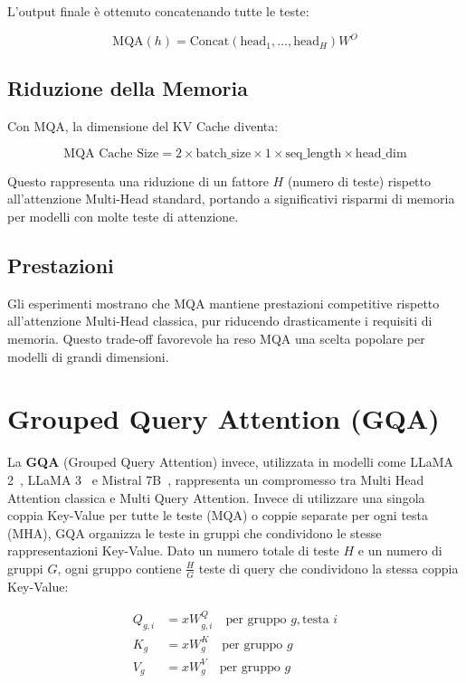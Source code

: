 L'output finale è ottenuto concatenando tutte le teste:

\[
    \text{MQA}(h) = \text{Concat}(\text{head}_1, \ldots, \text{head}_H) W^O
\]

\subsection{Riduzione della Memoria}
Con MQA, la dimensione del KV Cache diventa:

\[
    \text{MQA Cache Size} = 2 \times \text{batch\_size} \times 1 \times \text{seq\_length} \times \text{head\_dim}
\]

Questo rappresenta una riduzione di un fattore $H$ (numero di teste) rispetto all'attenzione Multi-Head standard, portando a significativi risparmi di memoria per modelli con molte teste di attenzione.

\subsection{Prestazioni}
Gli esperimenti mostrano che MQA mantiene prestazioni competitive rispetto all'attenzione Multi-Head classica, pur riducendo drasticamente i requisiti di memoria. Questo trade-off favorevole ha reso MQA una scelta popolare per modelli di grandi dimensioni.

\section{Grouped Query Attention (GQA)}

La \textbf{GQA} (Grouped Query Attention) invece, utilizzata in modelli come LLaMA 2~\cite{touvron2023llama}, LLaMA 3~\cite{touvron2024llama3} e Mistral 7B~\cite{mistral2023mistral7b}, rappresenta un compromesso tra Multi Head Attention classica e Multi Query Attention. Invece di utilizzare una singola coppia Key-Value per tutte le teste (MQA) o coppie separate per ogni testa (MHA), GQA organizza le teste in gruppi che condividono le stesse rappresentazioni Key-Value. Dato un numero totale di teste $H$ e un numero di gruppi $G$, ogni gruppo contiene $\frac{H}{G}$ teste di query che condividono la stessa coppia Key-Value:

\begin{align*}
    Q_{g,i} &= x W_{g,i}^Q \quad \text{per gruppo } g, \text{testa } i \\
    K_g &= x W_g^K \quad \text{per gruppo } g \\
    V_g &= x W_g^V \quad \text{per gruppo } g
\end{align*}


